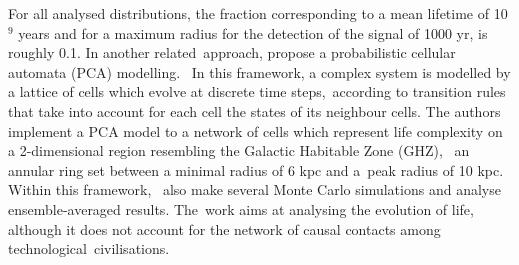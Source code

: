 \documentclass[crop]{CSLB}
\begin{document}
%
For all analysed distributions, the fraction corresponding to a mean lifetime of 10$^9$ years and for a maximum radius for the detection of the signal of 1000 yr, is roughly 0.1.
%
In another related approach, \citet{vukotic_astrobiological_2012} propose a probabilistic cellular automata (PCA) modelling. 
%
In this framework, a complex system is modelled by a lattice of cells which evolve at discrete time steps, according to transition rules that take into account for each cell the states of its neighbour cells.
%
The authors implement a PCA model to a network of cells which represent life complexity on a 2-dimensional region resembling the Galactic Habitable Zone (GHZ), 
an annular ring set between a minimal radius of 6 kpc and a peak radius of 10 kpc. 
%
Within this framework, \citet{vukotic_astrobiological_2012} also make several Monte Carlo simulations and analyse ensemble-averaged results.
%
The work aims at analysing the evolution of life, although it does not account for the network of causal contacts among technological civilisations.
\end{document}
